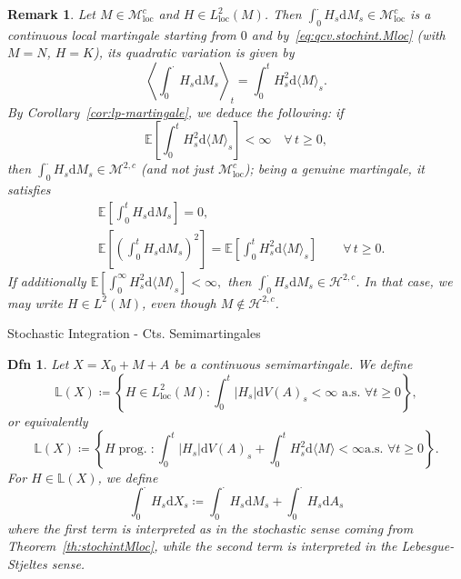 \documentclass[a4paper]{article}
\theoremstyle{mytheoremstyle}
\newtheorem{definition}{Dfn}
\newtheorem*{remark}{Remark}
\newcommand{\1}{\mathds{1}}
\begin{document}
\begin{multicols*}{3}
\begin{unlabeledbox}
\begin{remark}
  Let $M \in \mathcal{M}^c_{\operatorname{loc}}$ and $H \in L^2_{\operatorname{loc}} (M)$.
  Then $\int_0^{\cdot} H_s \mathrm{d} M_s \in \mathcal{M}^c_{\operatorname{loc}}$ is a
  continuous local martingale starting from $0$ and
  by~\eqref{eq:qcv.stochint.Mloc} (with $M = N$, $H = K$), its quadratic
  variation is given by
  \begin{equation}
    \left\langle \int_0^{\cdot} H_s \mathrm{d} M_s \right\rangle_t = \int_0^t
    H_s^2 \mathrm{d} \langle M \rangle_s . \label{eq:qv.stochint.Mloc}
  \end{equation}
  By Corollary~\ref{cor:lp-martingale}, we deduce the following: if
  \[ \mathbb{E} \left[ \int_0^t H_s^2 \mathrm{d} \langle M \rangle_s \right] <
     \infty \quad \forall \, t \geqslant 0, \]
  then $\int_0^{\cdot} H_s \mathrm{d} M_s \in \mathcal{M}^{2, c}$ (and not just
  $\mathcal{M}^c_{\operatorname{loc}}$); being a genuine martingale, it satisfies
  \begin{align*}
    & \mathbb{E} \left[ \int_0^t H_s \mathrm{d} M_s \right] = 0, \\
    & \mathbb{E} \left[ \left( \int_0^t H_s \mathrm{d} M_s \right)^2 \right] =\mathbb{E}
     \left[ \int_0^t H_s^2 \mathrm{d} \langle M \rangle_s \right] \qquad \forall
     \, t \geqslant 0.
  \end{align*}
  If additionally
  $\mathbb{E} \left[ \int_0^{\infty} H_s^2 \mathrm{d} \langle M \rangle_s
     \right] < \infty,$
  then $\int_0^{\cdot} H_s \mathrm{d} M_s \in \mathcal{H}^{2, c}$. In that case,
  we may write $H \in L^2 (M)$, even though $M \notin \mathcal{H}^{2, c}$.
\end{remark}
\end{unlabeledbox}

\begin{roundbox}{Stochastic Integration - Cts. Semimartingales}
\begin{definition}
  Let $X = X_0 + M + A$ be a continuous semimartingale. We define
  {
  \small
  \[ \mathbb{L} (X) \coloneq \left\{ H \in L^2_{\operatorname{loc}} (M) : \int_0^t |
     H_s | \mathrm{d} V (A)_s < \infty \text{ a.s. } \forall t \geqslant
     0 \right\}, \]
   }
  or equivalently
  {
  \footnotesize
  \[ \mathbb{L} (X) \coloneq \left\{ H \operatorname{prog.} : \int_0^t | H_s |
     \mathrm{d} V (A)_s + \int_0^t H_s^2 \mathrm{d} \langle M \rangle < \infty \text{
     a.s. } \forall t \geqslant 0 \right\} . \]
   }
  For $H \in \mathbb{L} (X)$, we define
  \[ \int_0^{\cdot} H_s \mathrm{d} X_s \coloneq \int_0^{\cdot} H_s \mathrm{d} M_s +
     \int_0^{\cdot} H_s \mathrm{d} A_s \]
  where the first term is interpreted as in the stochastic sense coming from
  Theorem~\ref{th:stochintMloc}, while the second term is interpreted in the
  Lebesgue-Stjeltes sense.
\end{definition}


\end{roundbox}
\end{multicols*}
\end{document}
